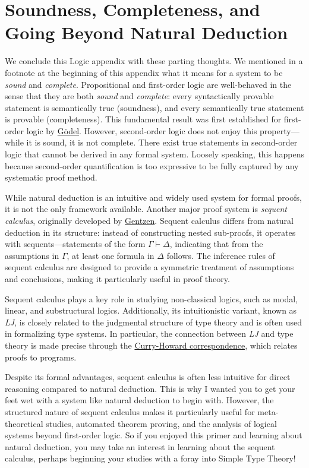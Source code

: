 \section{Soundness, Completeness, and Going Beyond Natural Deduction}

We conclude this Logic appendix with these parting thoughts. We mentioned in a footnote at the beginning of this appendix what it means for a system to be \textit{sound} and \textit{complete}.
Propositional and first-order logic are well-behaved in the sense that they are both \textit{sound} and \textit{complete}: every syntactically provable statement is semantically true (soundness),
and every semantically true statement is provable (completeness). This fundamental result was first established for first-order logic by \href{https://en.wikipedia.org/wiki/Kurt_G%C3%B6del}{G\"{o}del}. However, second-order logic does not enjoy this property—while it is sound, it is not complete. There exist
true statements in second-order logic that cannot be derived in any formal system. Loosely speaking, this happens because second-order quantification is too expressive to be fully captured
by any systematic proof method.

While natural deduction is an intuitive and widely used system for formal proofs, it is not the only framework available. Another major proof system is \textit{sequent calculus},
originally developed by \href{https://en.wikipedia.org/wiki/Gerhard_Gentzen}{Gentzen}. Sequent calculus differs from natural deduction in its structure: instead of constructing nested sub-proofs,
it operates with sequents—statements of the form  $\Gamma \vdash \Delta$, indicating that from the assumptions in  $\Gamma$, at least one formula in $\Delta$ follows. The inference
rules of sequent calculus are designed to provide a symmetric treatment of assumptions and conclusions, making it particularly useful in proof theory.

Sequent calculus plays a key role in studying non-classical logics, such as modal, linear, and substructural logics. Additionally, its intuitionistic variant, known as \textit{LJ},
is closely related to the judgmental structure of type theory and is often used in formalizing type systems. In particular, the connection between \textit{LJ} and type theory is made precise
through the \href{https://en.wikipedia.org/wiki/Curry%E2%80%93Howard_correspondence}{Curry-Howard correspondence}, which relates proofs to programs.

Despite its formal advantages, sequent calculus is often less intuitive for direct reasoning compared to natural deduction. This is why I wanted you to get your feet wet with a system like
natural deduction to begin with. However, the structured nature of sequent calculus makes it particularly useful for meta-theoretical studies, automated theorem proving, and the analysis
of logical systems beyond first-order logic. So if you enjoyed this primer and learning about natural deduction, you may take an interest in learning about the sequent calculus, perhaps beginning
your studies with a foray into Simple Type Theory!

